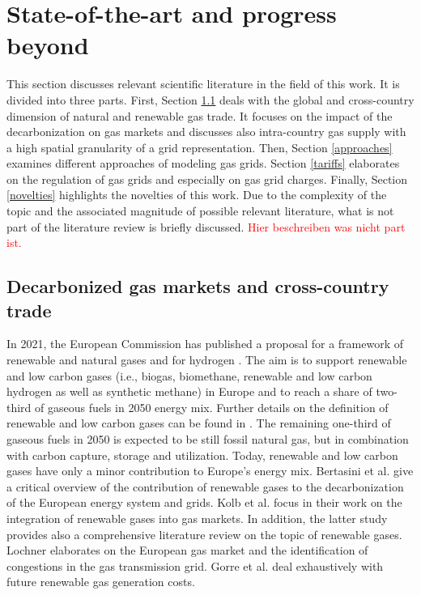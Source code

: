 \section{State-of-the-art and progress beyond}\label{stateoftheart}
This section discusses relevant scientific literature in the field of this work. It is divided into three parts. First, Section \ref{import} deals with the global and cross-country dimension of natural and renewable gas trade. It focuses on the impact of the decarbonization on gas markets and discusses also intra-country gas supply with a high spatial granularity of a grid representation. Then, Section \ref{approaches} examines different approaches of modeling gas grids. Section \ref{tariffs} elaborates on the regulation of gas grids and especially on gas grid charges. Finally, Section \ref{novelties} highlights the novelties of this work. Due to the complexity of the topic and the associated magnitude of possible relevant literature, what is not part of the literature review is briefly discussed. \textcolor{red}{Hier beschreiben was nicht part ist.} %

\subsection{Decarbonized gas markets and cross-country trade}\label{import}

In 2021, the European Commission has published a proposal for a framework of renewable and natural gases and for hydrogen \cite{regulation_renewable_gases}. The aim is to support renewable and low carbon gases (i.e., biogas, biomethane, renewable and low carbon hydrogen as well as synthetic methane) in Europe and to reach a share of two-third of gaseous fuels in 2050 energy mix. Further details on the definition of renewable and low carbon gases can be found in \cite{briefing_renewable_gases}. The remaining one-third of gaseous fuels in 2050 is expected to be still fossil natural gas, but in combination with carbon capture, storage and utilization. Today, renewable and low carbon gases have only a minor contribution to Europe's energy mix. Bertasini et al. \cite{bertasini2023decarbonization} give a critical overview of the contribution of renewable gases to the decarbonization of the European energy system and grids. Kolb et al. \cite{kolb2021scenarios} focus in their work on the integration of renewable gases into gas markets. In addition, the latter study provides also a comprehensive literature review on the topic of renewable gases. Lochner \cite{lochner2011identification} elaborates on the European gas market and the identification of congestions in the gas transmission grid. Gorre et al. \cite{gorre2019production} deal exhaustively with future renewable gas generation costs.\vspace{0.3cm}

